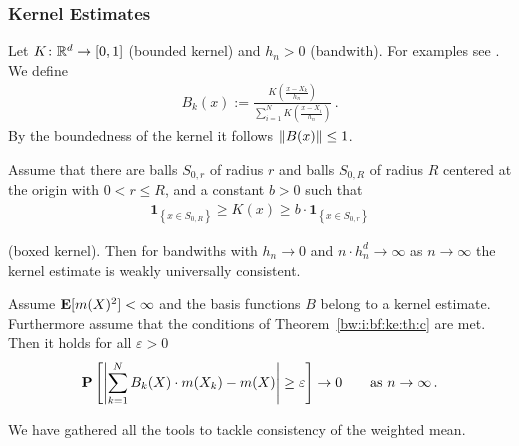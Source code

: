 \subsubsection*{Kernel Estimates}
Let $K\colon \mathbb{R}^d\to [0,1]$ (bounded kernel) and $h_n>0$ (bandwith).
For examples see \cite[§5.1.]{Gyorfi2002}.
We define
\begin{gather}
  B_k(x)
  :=
  \frac
  {
    K \left( \frac{x-X_k}{h_n} \right)
  }
  {
    \sum_{i=1}^{N} 
    K \left( \frac{x-X_i}{h_n} \right)
  }
  \,.
\end{gather}
By the boundedness of the kernel it follows
$\left\lVert B(x)\right\rVert\le 1$.
\begin{theorem}
  \label{bw:i:bf:ke:th:c}
  Assume that there are 
  balls
  $S_{0,r}$ of radius $r$ 
  and
  balls
  $S_{0,R}$ of radius $R$ 
  centered at the origin with $0<r\le R$, and a constant $b>0$ such that
  \begin{gather}
    \mathbf{1}_{\left\{ x\in S_{0,R} \right\}}
    \ge
    K(x)
    \ge
    b
    \cdot
    \mathbf{1}_{\left\{ x\in S_{0,r} \right\}}
  \end{gather}
\end{theorem}
(boxed kernel). Then for bandwiths with $h_n\to0$ and
$n\cdot h_n^d\to\infty$ as $n\to \infty$ the kernel estimate is weakly universally consistent.
\begin{corollary}
Assume
  $\mathbf{E}[m(X)^2]<\infty$
  and the basis functions $B$ belong to a kernel estimate.
  Furthermore assume that the conditions of 
  Theorem~\ref{bw:i:bf:ke:th:c} are met.
Then it holds for all $\varepsilon>0$
\begin{gather}
  \P
  \left[ 
    \left| 
    \sum_{k=1}^{N} 
    B_k(X)
    \cdot
    m(X_k)
    -
    m(X)
    \right|
    \ge
    \varepsilon
  \right]
  \to
  0
  \qquad
  \text{as}
  \ 
  n\to \infty
  \,.
\end{gather}
\end{corollary}

We have gathered all the tools to tackle consistency of the weighted mean.
